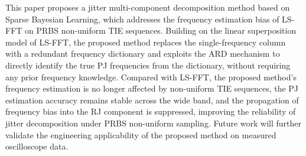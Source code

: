 \documentclass[10pt, a4paper, twocolumn]{article}
\begin{document}
This paper proposes a jitter multi-component decomposition method based on Sparse Bayesian Learning, which addresses the frequency estimation bias of LS-FFT on PRBS non-uniform TIE sequences. Building on the linear superposition model of LS-FFT, the proposed method replaces the single-frequency column with a redundant frequency dictionary and exploits the ARD mechanism to directly identify the true PJ frequencies from the dictionary, without requiring any prior frequency knowledge. Compared with LS-FFT, the proposed method's frequency estimation is no longer affected by non-uniform TIE sequences, the PJ estimation accuracy remains stable across the wide band, and the propagation of frequency bias into the RJ component is suppressed, improving the reliability of jitter decomposition under PRBS non-uniform sampling. Future work will further validate the engineering applicability of the proposed method on measured oscilloscope data.


\end{document}
